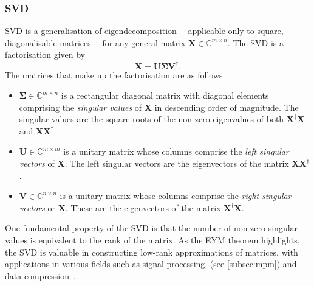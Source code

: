 \subsubsection{\Acf{SVD}}
\ac{SVD} is a generalisation of eigendecomposition\,---\,applicable only to
square, diagonalisable matrices\,---\,for any general matrix $\symbf{X} \in
\mathbb{C}^{m \times n}$. The \ac{SVD} is a factorisation given by
\begin{equation}
    \symbf{X} = \symbf{U} \symbf{\Sigma} \symbf{V}^{\dagger}.
\end{equation}
The matrices that make up the factorisation are as follows
\begin{itemize}
    \item $\symbf{\Sigma} \in \mathbb{C}^{m \times n}$ is a rectangular
        diagonal matrix with diagonal elements comprising the \emph{singular
        values} of $\symbf{X}$ in descending order of magnitude. The singular
        values are the square roots of the non-zero eigenvalues of both
        $\symbf{X}^{\dagger}\symbf{X}$ and $\symbf{X}\symbf{X}^{\dagger}$.
    \item $\symbf{U} \in \mathbb{C}^{m \times m}$ is a unitary matrix whose columns
        comprise the \emph{left singular vectors} of $\symbf{X}$. The left
        singular vectors are the eigenvectors of the matrix
        $\symbf{X}\symbf{X}^{\dagger}$.
    \item $\symbf{V} \in \mathbb{C}^{n \times n}$ is a unitary matrix whose columns
        comprise the \emph{right singular vectors} or $\symbf{X}$. These
        are the eigenvectors of the matrix $\symbf{X}^{\dagger}\symbf{X}$.
\end{itemize}
One fundamental property of the \ac{SVD} is that the number of non-zero
singular values is equivalent to the rank of the matrix. As the \ac{EYM}
theorem highlights, the \ac{SVD} is valuable in constructing low-rank
approximations of matrices, with applications in various fields such as signal
processing, (see \cref{subsec:mpm}) and data compression~\cite{Jaradat2021}.


